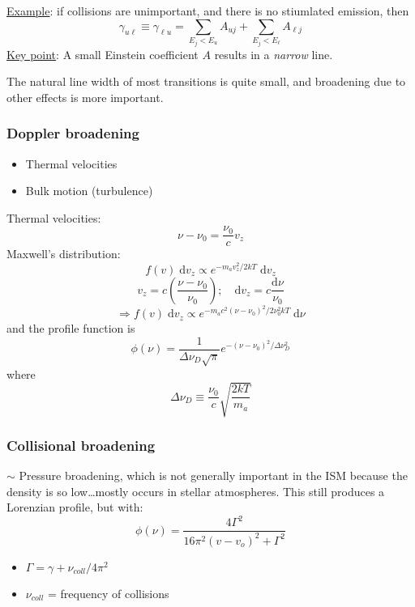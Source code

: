 \documentclass[11pt]{article}
\newcommand{\mar}[1]{\hspace{0pt}\marginpar{-\textcolor{black}{#1}-}}
\begin{document}
\underline{Example}:
if collisions are unimportant, and there is no stiumlated emission, then
\[
    \gamma_{u\ell} \equiv \gamma_{{\ell}u}
    = \sum_{E_{j} < E_{u}} A_{uj}
    + \sum_{E_{j} < E_{\ell}} A_{{\ell}j}
    \]
\underline{Key point}: A small Einstein coefficient $A$ results
in a \emph{narrow} line.

The natural line width of most transitions is quite small, and broadening
due to other effects is more important.

\subsubsection{Doppler broadening}
\begin{itemize}
    \item Thermal velocities
    \item Bulk motion (turbulence)
\end{itemize}
Thermal velocities:
\[
    \nu - \nu_{0} = \frac{\nu_{0}}{c} v_{z}
    \]
Maxwell's distribution:
\[
    f(v) \;\mathrm{d}v_{z} \propto e^{-m_{a}v_{z}^{2} / 2kT }
    \;\mathrm{d}v_{z}
    \]
\[
    v_{z} = c \left( \frac{\nu - \nu_{0}}{\nu_{0}} \right); \quad
    \mathrm{d}v_{z} = c \frac{\mathrm{d}\nu}{\nu_{0}}
    \]
\[
    \Rightarrow
    f(v) \;\mathrm{d}v_{z} \propto
    e^{-m_{a}c^{2}(\nu-\nu_{0})^{2} / 2\nu_{0}^{2}kT }
    \;\mathrm{d}\nu
    \]
\mar{32}and the profile function is
\[
    \phi(\nu) = \frac{1}{{\Delta}\nu_{D}\sqrt{\pi}}
    e^{-(\nu-\nu_{0})^{2} / {\Delta}\nu_{D}^{2}}
    \]
where
\[
    {\Delta}\nu_{D} \equiv \frac{\nu_{0}}{c}
    \sqrt{ \frac{2kT}{m_{a}} }
    \]

\subsubsection{Collisional broadening}
$\sim$ Pressure broadening, which is not generally important in the ISM because
the density is so low\ldots mostly occurs in stellar atmospheres.
This still produces a Lorenzian profile, but with:
\[
    \phi(\nu) = \frac{4\Gamma^{2}}{16\pi^{2}(v-v_{o})^{2} + \Gamma^{2}}
    \]
\begin{itemize}
    \item $\Gamma = \gamma + \nu_{coll}/4\pi^{2}$
    \item $\nu_{coll}$ = frequency of collisions
\end{itemize}
\end{document}
